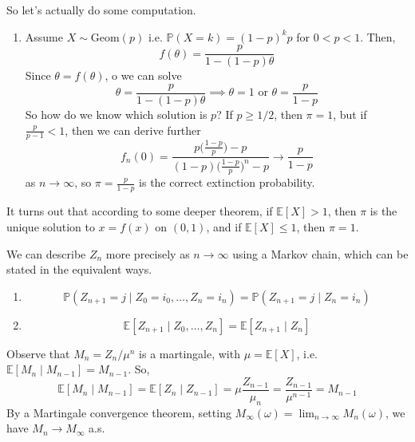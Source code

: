 \begin{example}
    So let's actually do some computation. 
    \begin{enumerate}
      \item Assume $X \sim \mathrm{Geom}(p)$ i.e. $\mathbb{P}(X = k) = (1 - p)^k p$ for $0 < p < 1$. Then, 
        \begin{equation}
          f(\theta) = \frac{p}{1 - (1 - p)\theta} 
        \end{equation}
        Since $\theta = f (\theta)$, o we can solve 
        \begin{equation}
          \theta = \frac{p}{1 - (1 - p) \theta} \implies \theta = 1 \text{ or } \theta = \frac{p}{1 - p}
        \end{equation}
        So how do we know which solution is $p$? If $p \geq 1/2$, then $\pi = 1$, but if $\frac{p}{p - 1} < 1$, then we can derive further 
        \begin{equation}
          f_n (0) = \frac{p \big(\frac{1 - p}{p} \big) - p}{(1 - p) \big( \frac{1 - p}{p} \big)^n - p} \to \frac{p}{1 - p}
        \end{equation}
        as $n \to \infty$, so $\pi = \frac{p}{1 - p}$ is the correct extinction probability. 
    \end{enumerate}
    It turns out that according to some deeper theorem, if $\mathbb{E}[X] > 1$, then $\pi$ is the unique solution to $x = f(x)$ on $(0, 1)$, and if $\mathbb{E}[X] \leq 1$, then $\pi = 1$. 
  \end{example}

  \begin{example}
    We can describe $Z_n$ more precisely as $n \to \infty$ using a Markov chain, which can be stated in the equivalent ways. 
    \begin{enumerate}
      \item 
        \begin{equation}
          \mathbb{P}(Z_{n+1} = j \mid Z_0 = i_0, \ldots, Z_n = i_n) = \mathbb{P}(Z_{n+1} = j \mid Z_n = i_n)
        \end{equation} 

      \item 
        \begin{equation}
          \mathbb{E}[Z_{n+1} \mid Z_0, \ldots, Z_n] = \mathbb{E}[Z_{n+1} \mid Z_n] 
        \end{equation}
    \end{enumerate}

    Observe that $M_n = Z_n / \mu^n$ is a martingale, with $\mu = \mathbb{E}[X]$, i.e. $\mathbb{E}[M_n \mid M_{n-1}] = M_{n-1}$. So, 
    \begin{equation}
      \mathbb{E}[M_n \mid M_{n-1}] = \mathbb{E}[Z_n \mid Z_{n-1}] = \mu \frac{Z_{n-1}}{\mu_n} = \frac{Z_{n-1}}{\mu^{n-1}} = M_{n-1}
    \end{equation}
    By a Martingale convergence theorem, setting $M_\infty (\omega) = \lim_{n \to \infty} M_n (\omega)$, we have $M_n \to M_\infty$ a.s. 
  \end{example}

